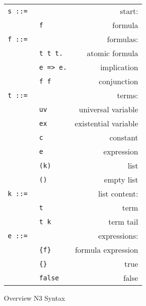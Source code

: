 \begin{figure}
\centering\small
\begin{tabular}{llr}
  \hline
  \texttt{s ::=} && start: \\
& \texttt{f}& formula\\
\texttt{f ::= } & & formulas:                 \\  
    &  \texttt{t t t.}&                atomic formula\\
    &  \texttt{e => e.}& implication\\
    &  \texttt{f f} &                 conjunction\\
 \texttt{t ::=}&&terms:                   \\
      & \texttt{uv}\hspace{0.3\textwidth} &                universal variable\\
            & \texttt{ex} &                existential variable\\
      & \texttt{c} &                constant\\
      & \texttt{e} &                 expression\\
      & \texttt{(k)}& list\\
      & \texttt{()}& empty list \\
\texttt{k ::=}&&list content: \\
&\texttt{t}& term\\
&\texttt{t k} & term tail\\
\texttt{e ::=}&&expressions:                    \\
       &\texttt{\{f\}} &               formula expression\\
       &\texttt{\{\}} & true\\
       &\texttt{false}       &               false\\
  \hline
\end{tabular}
\caption{Overview N3 Syntax \label{N3S}}
\end{figure}


